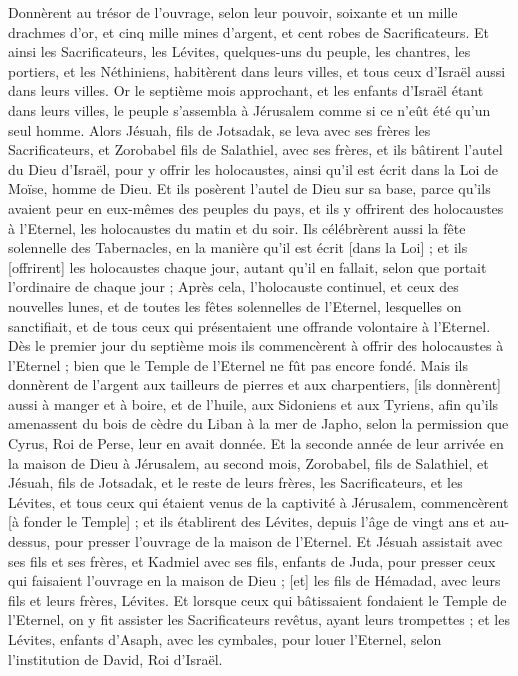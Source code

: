 \begin{multicols}{2}
Donnèrent au trésor de l'ouvrage, selon leur pouvoir, soixante et un mille drachmes d'or, et cinq mille mines d'argent, et cent robes de Sacrificateurs.
Et ainsi les Sacrificateurs, les Lévites, quelques-uns du peuple, les chantres, les portiers, et les Néthiniens, habitèrent dans leurs villes, et tous ceux d'Israël aussi dans leurs villes.
\VerseOne{}Or le septième mois approchant, et les enfants d'Israël étant dans leurs villes, le peuple s'assembla à Jérusalem comme si ce n'eût été qu'un seul homme.
Alors Jésuah, fils de Jotsadak, se leva avec ses frères les Sacrificateurs, et Zorobabel fils de Salathiel, avec ses frères, et ils bâtirent l'autel du Dieu d'Israël, pour y offrir les holocaustes, ainsi qu'il est écrit dans la Loi de Moïse, homme de Dieu.
Et ils posèrent l'autel de Dieu sur sa base, parce qu'ils avaient peur en eux-mêmes des peuples du pays, et ils y offrirent des holocaustes à l'Eternel, les holocaustes du matin et du soir.
Ils célébrèrent aussi la fête solennelle des Tabernacles, en la manière qu'il est écrit [dans la Loi] ; et ils [offrirent] les holocaustes chaque jour, autant qu'il en fallait, selon que portait l'ordinaire de chaque jour ;
Après cela, l'holocauste continuel, et ceux des nouvelles lunes, et de toutes les fêtes solennelles de l'Eternel, lesquelles on sanctifiait, et de tous ceux qui présentaient une offrande volontaire à l'Eternel.
Dès le premier jour du septième mois ils commencèrent à offrir des holocaustes à l'Eternel ; bien que le Temple de l'Eternel ne fût pas encore fondé.
Mais ils donnèrent de l'argent aux tailleurs de pierres et aux charpentiers, [ils donnèrent] aussi à manger et à boire, et de l'huile, aux Sidoniens et aux Tyriens, afin qu'ils amenassent du bois de cèdre du Liban à la mer de Japho, selon la permission que Cyrus, Roi de Perse, leur en avait donnée.
Et la seconde année de leur arrivée en la maison de Dieu à Jérusalem, au second mois, Zorobabel, fils de Salathiel, et Jésuah, fils de Jotsadak, et le reste de leurs frères, les Sacrificateurs, et les Lévites, et tous ceux qui étaient venus de la captivité à Jérusalem, commencèrent [à fonder le Temple] ; et ils établirent des Lévites, depuis l'âge de vingt ans et au-dessus, pour presser l'ouvrage de la maison de l'Eternel.
Et Jésuah assistait avec ses fils et ses frères, et Kadmiel avec ses fils, enfants de Juda, pour presser ceux qui faisaient l'ouvrage en la maison de Dieu ; [et] les fils de Hémadad, avec leurs fils et leurs frères, Lévites.
Et lorsque ceux qui bâtissaient fondaient le Temple de l'Eternel, on y fit assister les Sacrificateurs revêtus, ayant leurs trompettes ; et les Lévites, enfants d'Asaph, avec les cymbales, pour louer l'Eternel, selon l'institution de David, Roi d'Israël.

\end{multicols}
